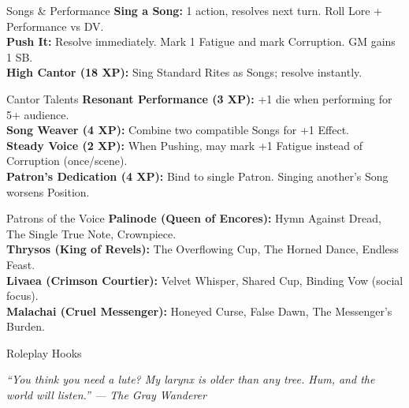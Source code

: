 \documentclass[10pt]{article}
\begin{document}
\begin{minipage}[t]{0.48\linewidth}
    \begin{charbox}{Songs \& Performance}
        \textbf{Sing a Song:} 1 action, resolves next turn. Roll Lore + Performance vs DV.\\
        \textbf{Push It:} Resolve immediately. Mark 1 Fatigue and mark Corruption. GM gains 1 SB.\\
        \textbf{High Cantor (18 XP):} Sing Standard Rites as Songs; resolve instantly.
    \end{charbox}
    
    \vspace{0.5em}
    
    \begin{charbox}{Cantor Talents}
        \textbf{Resonant Performance (3 XP):} +1 die when performing for 5+ audience.\\
        \textbf{Song Weaver (4 XP):} Combine two compatible Songs for +1 Effect.\\
        \textbf{Steady Voice (2 XP):} When Pushing, may mark +1 Fatigue instead of Corruption (once/scene).\\
        \textbf{Patron's Dedication (4 XP):} Bind to single Patron. Singing another's Song worsens Position.
    \end{charbox}
    
    \vspace{0.5em}
    
    \begin{charbox}{Patrons of the Voice}
        \textbf{Palinode (Queen of Encores):} Hymn Against Dread, The Single True Note, Crownpiece.\\
        \textbf{Thrysos (King of Revels):} The Overflowing Cup, The Horned Dance, Endless Feast.\\
        \textbf{Livaea (Crimson Courtier):} Velvet Whisper, Shared Cup, Binding Vow (social focus).\\
        \textbf{Malachai (Cruel Messenger):} Honeyed Curse, False Dawn, The Messenger's Burden.
    \end{charbox}
    
    \vspace{0.5em}
    
    \begin{charbox}{Roleplay Hooks}
        \underline{\hspace{7cm}}\\
        \underline{\hspace{7cm}}
    \end{charbox}
\end{minipage}

\vspace{1em}
\begin{center}
    {\small\sffamily\itshape ``You think you need a lute? My larynx is older than any tree. Hum, and the world will listen.'' --- The Gray Wanderer}
\end{center}
\end{document}
